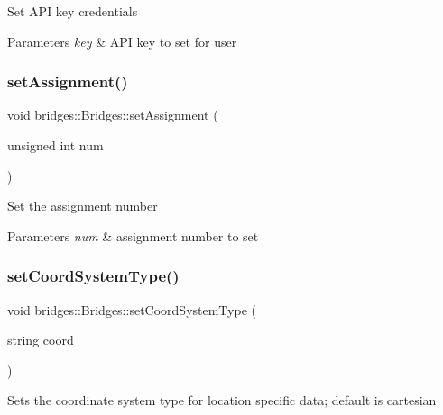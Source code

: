 Set A\+PI key credentials 
\begin{DoxyParams}{Parameters}
{\em key} & A\+PI key to set for user \\
\hline
\end{DoxyParams}
\mbox{\label{classbridges_1_1_bridges_aca7a68fb8cc0d1bec81656dfa77b1162}} 
\subsubsection{\texorpdfstring{set\+Assignment()}{setAssignment()}}
{\footnotesize\ttfamily void bridges\+::\+Bridges\+::set\+Assignment (\begin{DoxyParamCaption}\item[{unsigned int}]{num }\end{DoxyParamCaption})\hspace{0.3cm}{\ttfamily [inline]}}

Set the assignment number


\begin{DoxyParams}{Parameters}
{\em num} & assignment number to set \\
\hline
\end{DoxyParams}
\mbox{\label{classbridges_1_1_bridges_ad00c07d3a028110424909081a94c4013}} 
\subsubsection{\texorpdfstring{set\+Coord\+System\+Type()}{setCoordSystemType()}}
{\footnotesize\ttfamily void bridges\+::\+Bridges\+::set\+Coord\+System\+Type (\begin{DoxyParamCaption}\item[{string}]{coord }\end{DoxyParamCaption})\hspace{0.3cm}{\ttfamily [inline]}}

Sets the coordinate system type for location specific data; default is cartesian


